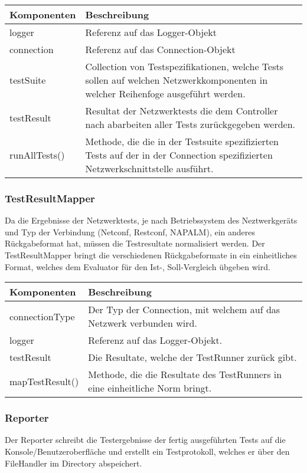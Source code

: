 \documentclass[
	ngerman,
	toc=listof, %
	toc=bibliography, %
	footnotes=multiple, %
	parskip=half, %
	numbers=noendperiod %
]{scrartcl}
\begin{document}
	\begin{tabularx}{\textwidth}{lX}
		\toprule
			Komponenten & Beschreibung \\
		\midrule
			logger & Referenz auf das Logger-Objekt \\ 
			connection & Referenz auf das Connection-Objekt \\
			testSuite & Collection von Testspezifikationen, welche Tests sollen auf welchen Netzwerkkomponenten in welcher Reihenfoge ausgeführt werden. \\
			testResult & Resultat der Netzwerktests die dem Controller nach abarbeiten aller Tests zurückgegeben werden. \\			
		\midrule
			runAllTests() & Methode, die die in der Testsuite spezifizierten Tests auf der in der Connection spezifizierten Netzwerkschnittstelle ausführt. \\
		\bottomrule
	\end{tabularx}
	\newpage

	\subsubsection{TestResultMapper}
	Da die Ergebnisse der Netzwerktests, je nach Betriebssystem des Neztwerkgeräts und Typ der Verbindung (Netconf, Restconf, NAPALM), ein anderes Rückgabeformat hat, müssen die Testresultate normalisiert werden.
	Der TestResultMapper bringt die verschiedenen Rückgabeformate in ein einheitliches Format, welches dem Evaluator für den Ist-, Soll-Vergleich übgeben wird.

	\begin{tabularx}{\textwidth}{lX}
		\toprule
			Komponenten & Beschreibung \\
		\midrule
			connectionType & Der Typ der Connection, mit welchem auf das Netzwerk verbunden wird. \\
			logger & Referenz auf das Logger-Objekt. \\	
			testResult & Die Resultate, welche der TestRunner zurück gibt. \\
		\midrule
			mapTestResult() & Methode, die die Resultate des TestRunners in eine einheitliche Norm bringt. \\
		\bottomrule
	\end{tabularx}

	\subsubsection{Reporter}
	Der Reporter schreibt die Testergebnisse der fertig ausgeführten Tests auf die Konsole/Benutzeroberfläche und erstellt ein Testprotokoll, welches er über den FileHandler im Directory abspeichert.
\end{document}
